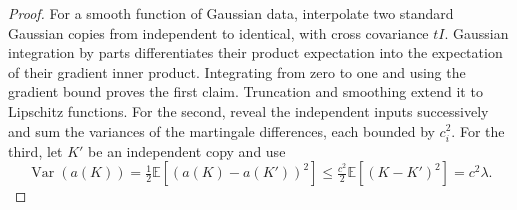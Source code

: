 \begin{proof}
For a smooth function of Gaussian data, interpolate two standard
Gaussian copies from independent to identical, with cross covariance
$tI$.  Gaussian integration by parts differentiates their product
expectation into the expectation of their gradient inner product.
Integrating from zero to one and using the gradient bound proves the
first claim.  Truncation and smoothing extend it to Lipschitz functions.
For the second, reveal the independent inputs successively and sum the
variances of the martingale differences, each bounded by $c_i^2$.
For the third, let $K'$ be an independent copy and use
\[
 \operatorname{Var}(a(K))
 =\tfrac12\mathbb E[(a(K)-a(K'))^2]
 \leq\tfrac{c^2}{2}\mathbb E[(K-K')^2]=c^2\lambda.
\]
\end{proof}
